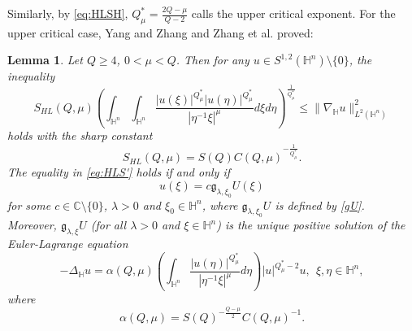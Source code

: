 \documentclass[11pt]{article}
\newtheorem{lemma}{Lemma}[section]
\begin{document}
Similarly, by \eqref{eq:HLSH}, $Q^{\ast}_{\mu}=\frac{2Q-\mu}{Q-2}$ calls the upper critical exponent.
For the upper critical case,  Yang and Zhang \cite{YZ251} and Zhang et al. \cite{ZWZLX25} proved: %
\begin{lemma}%
	Let $Q\geq 4$, $0<\mu<Q$. Then for any $u\in S^{1,2}(\mathbb{H}^{n})\setminus\{0\}$, the inequality
	\begin{equation}\label{eq:HLS'}
		S_{HL}(Q,\mu)	\left(\int_{\mathbb{H}^{n}}\int_{\mathbb{H}^{n}}\frac{|u(\xi)|^{Q^{\ast}_{\mu}}|u(\eta)|
^{Q^{\ast}_{\mu}}}{|\eta^{-1}\xi|^{\mu}}{d}\xi{d}\eta\right)^{\frac{1}{Q^{\ast}_{\mu}}}\leq \|\nabla_{\mathbb{H}}u\|^2_{L^2(\mathbb{H}^{n})}
	\end{equation}
holds with the sharp constant
\begin{equation*}
  S_{HL}(Q,\mu)=S(Q)C(Q,\mu)^{-\frac{1}{Q_\mu^*}}.
\end{equation*}
The equality in \eqref{eq:HLS'} holds
if and only if
	\begin{equation*}%
u(\xi)=c\mathfrak{g}_{\lambda,\xi_0}U(\xi)%
	\end{equation*}
	for some $c\in\mathbb{C}\setminus\{0\}$, $\lambda>0$ and $\xi_0\in \mathbb{H}^n$, where $\mathfrak{g}_{\lambda,\xi_0}U$ is defined by \eqref{gU}. Moreover, %
$\mathfrak{g}_{\lambda,\xi}U$ (for all $\lambda>0$ and $\xi\in\mathbb{H}^{n}$) is the unique positive solution  of the Euler-Lagrange equation
\begin{equation}\label{limit3}
  -\Delta_{\mathbb{H}} u=\alpha(Q,\mu)\left(\int_{\mathbb{H}^{n}}\frac{|u(\eta)|
^{Q^{\ast}_{\mu}}}{|\eta^{-1}\xi|^{\mu}}{d}\eta\right)|u|^{Q_\mu^*-2}u,~~\xi,\eta\in\mathbb{H}^{n},
\end{equation}
where
\begin{equation*}%
\alpha(Q,\mu)=S(Q)^{-\frac{Q-\mu}{2}}C(Q,\mu)^{-1}.
\end{equation*}
\end{lemma}
\end{document}
